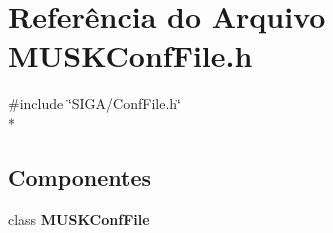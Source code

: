 \section{Referência do Arquivo M\+U\+S\+K\+Conf\+File.\+h}
\label{_m_u_s_k_conf_file_8h}
{\ttfamily \#include \char`\"{}S\+I\+G\+A/\+Conf\+File.\+h\char`\"{}}\\*
\subsection*{Componentes}
\begin{DoxyCompactItemize}
\item 
class {\bf M\+U\+S\+K\+Conf\+File}
\end{DoxyCompactItemize}
